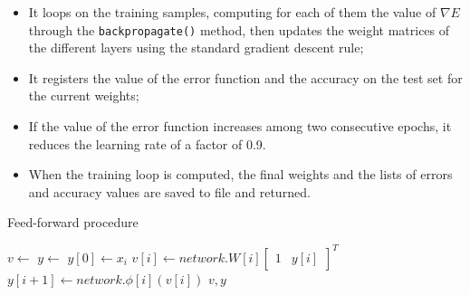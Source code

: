 \documentclass[letterpaper,headings=standardclasses]{scrartcl}
\begin{document}
\begin{itemize}
\begin{itemize}
        \item It loops on the training samples, computing for each of them the value of $\nabla E$ through the \texttt{backpropagate()} method, then updates the weight matrices of the different layers using the standard gradient descent rule;
        
        \item It registers the value of the error function and the accuracy on the test set for the current weights;
        
        \item If the value of the error function increases among two consecutive epochs, it reduces the learning rate of a factor of 0.9.
        
        \item When the training loop is computed, the final weights and the lists of errors and accuracy values are saved to file and returned.

    \end{itemize}

\end{itemize}

\begin{algorithm}[H]
    \caption{Feed-forward procedure}
    \label{ffalg}
    \begin{algorithmic}
    
        \State {}
        \State $v \gets $ 
        \State $y \gets $ 
        \State $y[0] \gets x_i$
        \State {}
            \State $v[i] \gets network.W[i] \left[ \begin{matrix} 1 & y[i] \end{matrix} \right]^T$
            \State $y[i + 1] \gets network.\phi[i](v[i])$
        \EndFor
        \State \Return $v, y$
    \EndFunction

    \end{algorithmic}
\end{algorithm}
\end{document}
